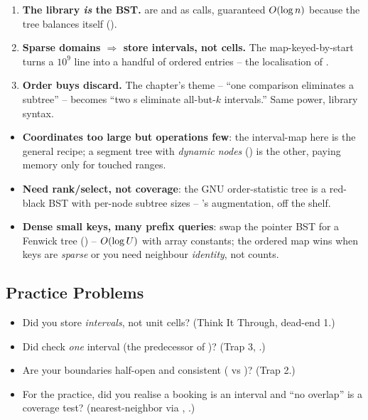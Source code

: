 \begin{insightbox}
\begin{enumerate}[nosep, leftmargin=1.6em]
  \item \textbf{The library \emph{is} the BST.}  are  and
         as calls, guaranteed $O(\log n)$ because the tree balances itself
        ().
  \item \textbf{Sparse domains $\Rightarrow$ store intervals, not cells.} The map-keyed-by-start turns a
        $10^{9}$ line into a handful of ordered entries -- the localisation of .
  \item \textbf{Order buys discard.} The chapter's theme -- ``one comparison eliminates a subtree'' --
        becomes ``two s eliminate all-but-$k$ intervals.'' Same power, library syntax.
\end{enumerate}
\end{insightbox}

\begin{hardeningbox}
\begin{itemize}[nosep, leftmargin=1.4em]
  \item \textbf{Coordinates too large but operations few}: the interval-map here is the general recipe;
        a segment tree with \emph{dynamic nodes} () is the other, paying memory only for
        touched ranges.
  \item \textbf{Need rank/select, not coverage}: the GNU  order-statistic tree is a
        red-black BST with per-node subtree sizes -- 's augmentation, off the shelf.
  \item \textbf{Dense small keys, many prefix queries}: swap the pointer BST for a Fenwick tree
        () -- $O(\log U)$ with array constants; the ordered map wins when keys are
        \emph{sparse} or you need neighbour \emph{identity}, not counts.
\end{itemize}
\end{hardeningbox}

\subsection{Practice Problems}

\begin{stuckbox}
\begin{itemize}[nosep, leftmargin=1.4em]
  \item Did you store \emph{intervals}, not unit cells? (Think It Through, dead-end 1.)
  \item Did  check \emph{one} interval (the predecessor of )? (Trap 3, .)
  \item Are your boundaries half-open and consistent ( vs )? (Trap 2.)
  \item For the practice, did you realise a booking is an interval and ``no overlap'' is a coverage test?
        (nearest-neighbor via , .)
\end{itemize}
\end{stuckbox}

